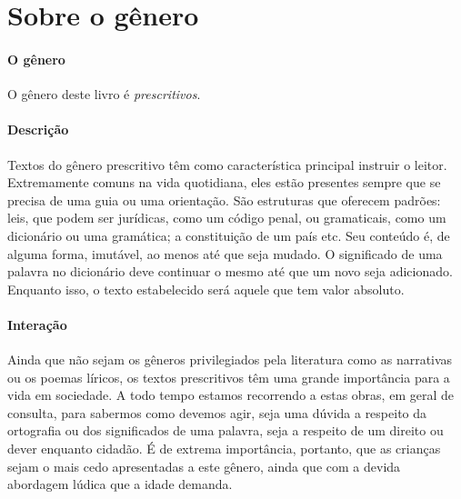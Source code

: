 \documentclass[11pt]{extarticle}
\begin{document}
\section{Sobre o gênero}

\paragraph{O gênero} O gênero deste livro é \textit{prescritivos}. 


\paragraph{Descrição} 
Textos do gênero prescritivo têm como característica principal instruir
o leitor. Extremamente comuns na vida quotidiana, eles estão presentes
sempre que se precisa de uma guia ou uma orientação. São estruturas 
que oferecem padrões: leis, que podem ser jurídicas, como um código
penal, ou gramaticais, como um dicionário ou uma gramática; a constituição
de um país etc. Seu conteúdo é, de alguma forma, imutável, ao menos até que seja
mudado. O significado de uma palavra no dicionário deve continuar o mesmo
até que um novo seja adicionado. Enquanto isso, o texto
estabelecido será aquele que tem valor absoluto.


\paragraph{Interação} 
Ainda que não sejam os gêneros privilegiados pela literatura
como as narrativas ou os poemas líricos, os textos prescritivos
têm uma grande importância para a vida em sociedade. A todo 
tempo estamos recorrendo a estas obras, em geral de consulta, para
sabermos como devemos agir, seja uma dúvida a respeito da ortografia ou 
dos significados de uma palavra, seja a respeito de um direito ou dever
enquanto cidadão. É de extrema importância, portanto, que as crianças
sejam o mais cedo apresentadas a este gênero, ainda que com a 
devida abordagem lúdica que a idade demanda. 

\end{document}
